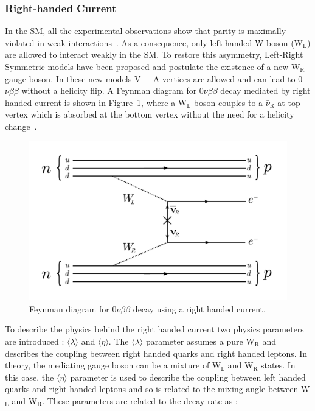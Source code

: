 \documentclass[main.tex]{subfiles}
\begin{document}
\subsubsection{Right-handed Current}


\NI In the SM, all the experimental observations show that parity is maximally violated in weak interactions~\cite{Wu,NeutrinoHelicity}. As a consequence,  only left-handed W boson (W$_\text{L}$) are allowed to interact weakly in the SM. To restore this asymmetry, Left-Right Symmetric models have been proposed and postulate the existence of a new W$_\text{R}$ gauge boson. In these new models V + A vertices are allowed and can lead to 0$\nu\beta\beta$ without a helicity flip. A Feynman diagram for 0$\nu\beta\beta$ decay mediated by right handed current is shown in Figure~\ref{OnbbFeynmanDiagramRHC}, where a W$_\text{L}$ boson couples to a $\bar{\nu}_\text{R}$ at top vertex which is absorbed at the bottom vertex without the need for a helicity change~\cite{DBDRightHandedCurrent}.


\begin{figure}[h!]
\begin{center}
\includegraphics[scale=0.45]{pictures/Chap2/0nubbFeynmanDiagram_RHC.pdf}
\caption{Feynman diagram for 0$\nu\beta\beta$ decay using a right handed current.}
\label{OnbbFeynmanDiagramRHC}
\end{center}
\end{figure}


\NI To describe the physics behind the right handed current two physics parameters are introduced : $\langle \lambda \rangle$ and $\langle \eta \rangle$. The $\langle \lambda \rangle$ parameter assumes a pure W$_\text{R}$ and describes the coupling between right handed quarks and right handed leptons. In theory, the mediating gauge boson can be a mixture of W$_\text{L}$ and W$_\text{R}$ states. In this case, the $\langle \eta \rangle$ parameter is used to describe the coupling between left handed quarks and right handed leptons and so is related to the mixing angle between W$_\text{L}$ and W$_\text{R}$. These parameters are related to the decay rate as :
\end{document}

